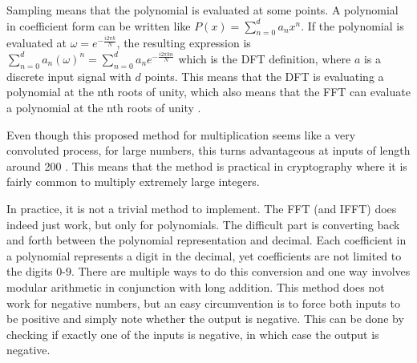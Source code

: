 Sampling means that the polynomial is evaluated at some points. A polynomial in coefficient form can be written like $P(x) = \sum^d_{n=0} a_nx^n$. If the polynomial is evaluated at $\omega = e^{-\frac{i2\pi k}{N}}$, the resulting expression is $\sum^d_{n=0} a_n(\omega)^n = \sum^d_{n=0} a_ne^{-\frac{i2\pi k n}{N}}$ which is the DFT definition, where $a$ is a discrete input signal with $d$ points. This means that the DFT is evaluating a polynomial at the nth roots of unity, which also means that the FFT can evaluate a polynomial at the nth roots of unity \cite{Emerencia2007}.

Even though this proposed method for multiplication seems like a very convoluted process, for large numbers, this turns advantageous at inputs of length around 200 \cite{Emerencia2007}. This means that the method is practical in cryptography where it is fairly common to multiply extremely large integers. 

In practice, it is not a trivial method to implement. The FFT (and IFFT) does indeed just work, but only for polynomials. The difficult part is converting back and forth between the polynomial representation and decimal. Each coefficient in a polynomial represents a digit in the decimal, yet coefficients are not limited to the digits 0-9. There are multiple ways to do this conversion and one way involves modular arithmetic in conjunction with long addition. This method does not work for negative numbers, but an easy circumvention is to force both inputs to be positive and simply note whether the output is negative. This can be done by checking if exactly one of the inputs is negative, in which case the output is negative.





